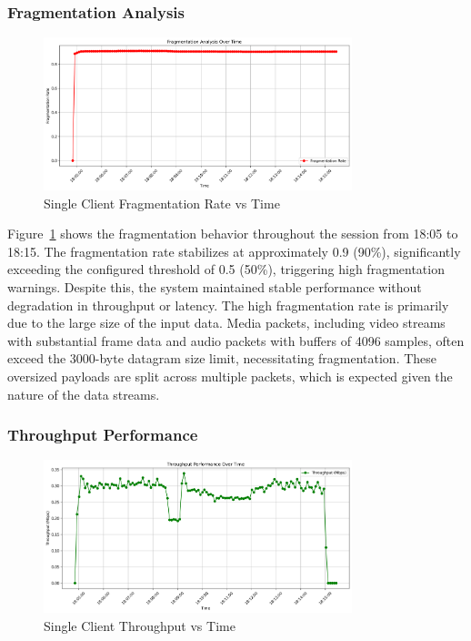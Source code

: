 \subsubsection{Fragmentation Analysis}

\begin{figure}[h!]
\centering
\includegraphics[width=0.8\textwidth]{Evaluation/single_fragmentation_analysis.png}
\caption{Single Client Fragmentation Rate vs Time}
\label{fig:fragmentation-analysis}
\end{figure}

Figure~\ref{fig:fragmentation-analysis} shows the fragmentation behavior throughout the session from 18:05 to 18:15. The fragmentation rate stabilizes at approximately 0.9 (90\%), significantly exceeding the configured threshold of 0.5 (50\%), triggering high fragmentation warnings. Despite this, the system maintained stable performance without degradation in throughput or latency.
The high fragmentation rate is primarily due to the large size of the input data. Media packets, including video streams with substantial frame data and audio packets with buffers of 4096 samples, often exceed the 3000-byte datagram size limit, necessitating fragmentation. These oversized payloads are split across multiple packets, which is expected given the nature of the data streams.



\subsubsection{Throughput Performance}

\begin{figure}[h!]
\centering
\includegraphics[width=0.8\textwidth]{Evaluation/single_throughput_performance.png}
\caption{Single Client Throughput vs Time}
\label{fig:single-throughput-performance}
\end{figure}

